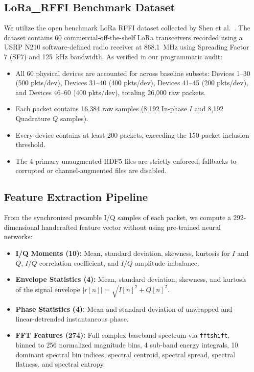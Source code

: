 \documentclass[conference]{IEEEtran}
\begin{document}
\subsection{LoRa\_RFFI Benchmark Dataset}
We utilize the open benchmark LoRa RFFI dataset collected by Shen et al.~\cite{shen2022dataset}. The dataset contains 60 commercial-off-the-shelf LoRa transceivers recorded using a USRP N210 software-defined radio receiver at 868.1~MHz using Spreading Factor 7 (SF7) and 125~kHz bandwidth. As verified in our programmatic audit:
\begin{itemize}
    \item All 60 physical devices are accounted for across baseline subsets: Devices 1--30 (500 pkts/dev), Devices 31--40 (400 pkts/dev), Devices 41--45 (200 pkts/dev), and Devices 46--60 (400 pkts/dev), totaling 26,000 raw packets.
    \item Each packet contains 16,384 raw samples (8,192 In-phase $I$ and 8,192 Quadrature $Q$ samples).
    \item Every device contains at least 200 packets, exceeding the 150-packet inclusion threshold.
    \item The 4 primary unaugmented HDF5 files are strictly enforced; fallbacks to corrupted or channel-augmented files are disabled.
\end{itemize}

\subsection{Feature Extraction Pipeline}
From the synchronized preamble I/Q samples of each packet, we compute a 292-dimensional handcrafted feature vector without using pre-trained neural networks:
\begin{itemize}
    \item \textbf{I/Q Moments (10):} Mean, standard deviation, skewness, kurtosis for $I$ and $Q$, $I/Q$ correlation coefficient, and $I/Q$ amplitude imbalance.
    \item \textbf{Envelope Statistics (4):} Mean, standard deviation, skewness, and kurtosis of the signal envelope $|r[n]| = \sqrt{I[n]^2 + Q[n]^2}$.
    \item \textbf{Phase Statistics (4):} Mean and standard deviation of unwrapped and linear-detrended instantaneous phase.
    \item \textbf{FFT Features (274):} Full complex baseband spectrum via \texttt{fftshift}, binned to 256 normalized magnitude bins, 4 sub-band energy integrals, 10 dominant spectral bin indices, spectral centroid, spectral spread, spectral flatness, and spectral entropy.
\end{itemize}
\end{document}
